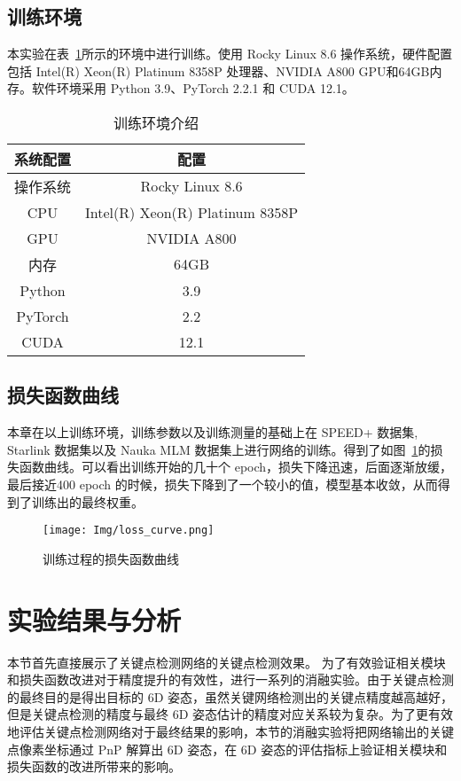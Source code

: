 \subsection{训练环境}
本实验在表~\ref{tab:training_env}所示的环境中进行训练。使用 Rocky Linux 8.6 操作系统，硬件配置包括 Intel(R) Xeon(R) Platinum 8358P 处理器、NVIDIA A800 GPU和64GB内存。软件环境采用 Python 3.9、PyTorch 2.2.1 和 CUDA 12.1。

\begin{table}[htbp]
	\centering
	\caption{训练环境介绍}
	\label{tab:training_env}
	{%
		\renewcommand{\arraystretch}{1.2}%
		\begin{tabular}{cc}
			\toprule[1.5pt]
			系统配置   & 配置 \\
			\midrule[1pt]
			操作系统   & Rocky Linux 8.6 \\
			CPU        & Intel(R) Xeon(R) Platinum 8358P \\
			GPU        & NVIDIA A800 \\
			内存       & 64GB \\
			Python     & 3.9 \\
			PyTorch    & 2.2 \\
			CUDA       & 12.1 \\
			\bottomrule[1.5pt]
		\end{tabular}
	}
\end{table}



\subsection{损失函数曲线}
本章在以上训练环境，训练参数以及训练测量的基础上在 SPEED+ 数据集, Starlink 数据集以及 Nauka MLM 数据集上进行网络的训练。得到了如图~\ref{fig:loss_cure}的损失函数曲线。可以看出训练开始的几十个 epoch，损失下降迅速，后面逐渐放缓，最后接近400 epoch 的时候，损失下降到了一个较小的值，模型基本收敛，从而得到了训练出的最终权重。
\begin{figure}[htbp]
	\centering
	\texttt{[image: Img/loss\_curve.png]}
	\caption{训练过程的损失函数曲线}
	\label{fig:loss_cure}
	\vspace{-15pt}
\end{figure}
\section{实验结果与分析}
本节首先直接展示了关键点检测网络的关键点检测效果。
为了有效验证相关模块和损失函数改进对于精度提升的有效性，进行一系列的消融实验。由于关键点检测的最终目的是得出目标的 6D 姿态，虽然关键网络检测出的关键点精度越高越好，但是关键点检测的精度与最终 6D 姿态估计的精度对应关系较为复杂。为了更有效地评估关键点检测网络对于最终结果的影响，本节的消融实验将把网络输出的关键点像素坐标通过 PnP 解算出 6D 姿态，在 6D 姿态的评估指标上验证相关模块和损失函数的改进所带来的影响。


